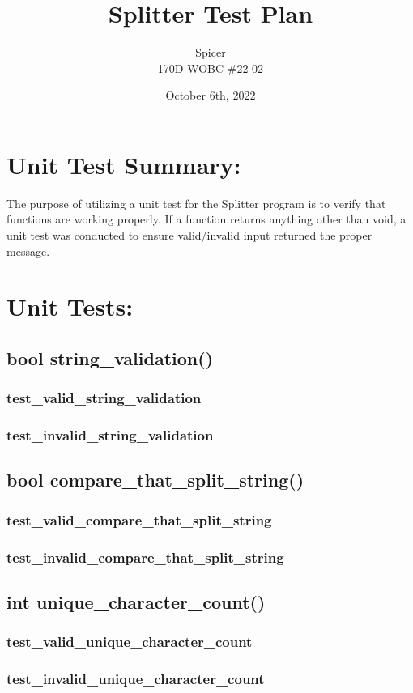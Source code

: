 \documentclass[12pt]{article}
\begin{document}
\title{Splitter Test Plan}
\author{\Kyle Spicer\\ 170D WOBC \#22-02}
\date{October 6th, 2022}

\maketitle

\section{Unit Test Summary:}\label{Test Plan Summary}
The purpose of utilizing a unit test for the Splitter program is to verify that functions are working properly. If a function returns anything other than void, a unit test was conducted to ensure valid/invalid input returned the proper message.

\section{Unit Tests:}\label{Unit Tests:}
\subsection{bool string\_validation()}
\subsubsection{test\_valid\_string\_validation}
\subsubsection{test\_invalid\_string\_validation}
\newline

\subsection{bool compare\_that\_split\_string()}
\subsubsection{test\_valid\_compare\_that\_split\_string}

\subsubsection{test\_invalid\_compare\_that\_split\_string}
\newline

\subsection{int unique\_character\_count()}
\subsubsection{test\_valid\_unique\_character\_count}
\subsubsection{test\_invalid\_unique\_character\_count}
\newline
\end{document}
